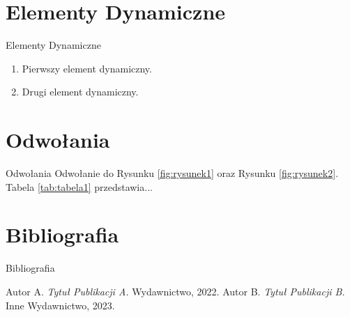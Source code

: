 \documentclass{beamer}
\begin{document}
\section{Elementy Dynamiczne}
\begin{frame}{Elementy Dynamiczne}
  \begin{enumerate}
    \item Pierwszy element dynamiczny.
    \item Drugi element dynamiczny.
  \end{enumerate}
\end{frame}

\section{Odwołania}
\begin{frame}{Odwołania}
  Odwołanie do Rysunku \ref{fig:rysunek1} oraz Rysunku \ref{fig:rysunek2}. Tabela \ref{tab:tabela1} przedstawia...
\end{frame}

\section{Bibliografia}
\begin{frame}{Bibliografia}
  \begin{thebibliography}{9}
     Autor A. \emph{Tytuł Publikacji A.} Wydawnictwo, 2022.
     Autor B. \emph{Tytuł Publikacji B.} Inne Wydawnictwo, 2023.
  \end{thebibliography}
\end{frame}
\end{document}
